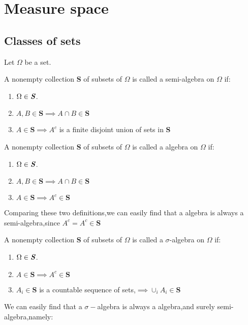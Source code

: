 \section{Measure space}

\subsection{Classes of sets}

Let \textbf{\textit{$\Omega$}} be a set.

\begin{definition}\label{def:semi-algebra}
    A nonempty collection  \textbf{S} of subsets of $\Omega$ is called a semi-algebra on $\Omega$ if:\smallskip
    \begin{enumerate}
        \item $\Omega \in \textbf{\textit{S}}$.
        \item $A , B \in \textbf{S} \implies A \cap B \in \textbf{S} $
        \item $A \in \textbf{S} \implies A^c$ is a finite disjoint union of sets in \textbf{S}
    \end{enumerate}
\end{definition}

\begin{definition}[Algebra]\label{def:algebra}
    A nonempty collection  \textbf{S} of subsets of $\Omega$ is called a algebra on $\Omega$ if:\smallskip
    \begin{enumerate}
        \item $\Omega \in \textbf{\textit{S}}$.
        \item $A , B \in \textbf{S} \implies A \cap B \in \textbf{S} $
        \item $A \in \textbf{S} \implies A^c \in \textbf{S}$ 
    \end{enumerate}
\end{definition}

Comparing these two definitions,we can easily find that a algebra is always a semi-algebra,since $A^c = A^c \in \textbf{S}$

\begin{definition}\label{def:sigma-algebra}
    A nonempty collection  \textbf{S} of subsets of $\Omega$ is called a $\sigma$-algebra on $\Omega$ if:\smallskip
    \begin{enumerate}
        \item $\Omega \in \textbf{\textit{S}}$.
        \item $A \in \textbf{S} \implies A^c \in \textbf{S}$
        \item $A_i \in \textbf{S}$ is a countable sequence of sets,$\implies \cup_i A_i \in \textbf{S}$
    \end{enumerate}
\end{definition}

We can easily find that a $\sigma-$algebra is always a algebra,and surely semi-algebra,namely:\smallskip



